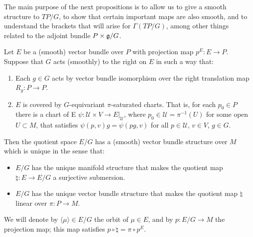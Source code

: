 

The main purpose of the next propositions is to allow us to give a smooth structure to $TP/G$, to show that certain important maps are also smooth, and to understand the brackets that will arise for $\Gamma(TP/G)$, among other things related to the adjoint bundle $P\times \mathfrak{g}/G$.

\begin{proposition} \label{3.1.1}
Let $E$ be a (smooth) vector bundle over $P$ with projection map $p^E: E \to P$. Suppose that $G$ acts (smoothly) to the right on $E$ in such a way that:

\begin{enumerate}
    \item Each $g \in G$ acts by vector bundle isomorphism over the right translation map $R_g: P \to P$.
    
    \item $E$ is covered by $G$-equivariant $\pi$-saturated charts. That is, for each $p_0 \in P$ there is a chart of E $\psi: \mathcal U \times V \to E|_{\mathcal U}$, where $p_0 \in \mathcal U = \pi^{-1}(U)$ for some open $U \subset M$, that satisfies $\psi(p, v)g = \psi(pg, v)$ for all $p \in \mathcal U$, $v \in V$, $g \in G$.
\end{enumerate}

Then the quotient space $E/G$ has a (smooth) vector bundle structure over $M$ which is unique in the sense that:

\begin{itemize}
    \item $E/G$ has the unique manifold structure that makes the quotient map $\natural: E \to E/G$ a surjective submersion.
    \item $E/G$ has the unique vector bundle structure that makes the quotient map $\natural$ linear over $\pi: P \to M$.
\end{itemize}

We will denote by $\langle \mu \rangle \in E/G$ the orbit of $\mu \in E$, and by $p:E/G \to M$ the projection map; this map satisfies $p \circ \natural = \pi \circ p^E$.

\end{proposition}

